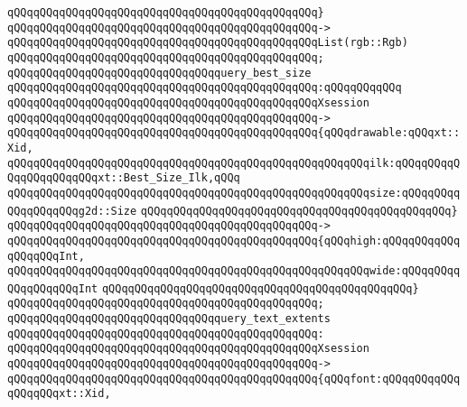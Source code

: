 \verb|qQQqqQQqqQQqqQQqqQQqqQQqqQQqqQQqqQQqqQQqqQQqqQQq}|\newline
\verb|qQQqqQQqqQQqqQQqqQQqqQQqqQQqqQQqqQQqqQQqqQQqqQQq->|\newline
\verb|qQQqqQQqqQQqqQQqqQQqqQQqqQQqqQQqqQQqqQQqqQQqqQQqList(rgb::Rgb)|\newline
\verb|qQQqqQQqqQQqqQQqqQQqqQQqqQQqqQQqqQQqqQQqqQQqqQQq;|\newline
\newline
\verb|qQQqqQQqqQQqqQQqqQQqqQQqqQQqqQQqquery_best_size|\newline
\verb|qQQqqQQqqQQqqQQqqQQqqQQqqQQqqQQqqQQqqQQqqQQqqQQq:qQQqqQQqqQQq|\newline
\verb|qQQqqQQqqQQqqQQqqQQqqQQqqQQqqQQqqQQqqQQqqQQqqQQqXsession|\newline
\verb|qQQqqQQqqQQqqQQqqQQqqQQqqQQqqQQqqQQqqQQqqQQqqQQq->|\newline
\verb|qQQqqQQqqQQqqQQqqQQqqQQqqQQqqQQqqQQqqQQqqQQqqQQq{qQQqdrawable:qQQqxt::Xid,|\newline
\verb|qQQqqQQqqQQqqQQqqQQqqQQqqQQqqQQqqQQqqQQqqQQqqQQqqQQqqQQqilk:qQQqqQQqqQQqqQQqqQQqqQQqxt::Best_Size_Ilk,qQQq|\newline
\verb|qQQqqQQqqQQqqQQqqQQqqQQqqQQqqQQqqQQqqQQqqQQqqQQqqQQqqQQqsize:qQQqqQQqqQQqqQQqqQQqg2d::Size|\newline
\verb|qQQqqQQqqQQqqQQqqQQqqQQqqQQqqQQqqQQqqQQqqQQqqQQq}|\newline
\verb|qQQqqQQqqQQqqQQqqQQqqQQqqQQqqQQqqQQqqQQqqQQqqQQq->|\newline
\verb|qQQqqQQqqQQqqQQqqQQqqQQqqQQqqQQqqQQqqQQqqQQqqQQq{qQQqhigh:qQQqqQQqqQQqqQQqqQQqInt,|\newline
\verb|qQQqqQQqqQQqqQQqqQQqqQQqqQQqqQQqqQQqqQQqqQQqqQQqqQQqqQQqwide:qQQqqQQqqQQqqQQqqQQqInt|\newline
\verb|qQQqqQQqqQQqqQQqqQQqqQQqqQQqqQQqqQQqqQQqqQQqqQQq}|\newline
\verb|qQQqqQQqqQQqqQQqqQQqqQQqqQQqqQQqqQQqqQQqqQQqqQQq;|\newline
\newline
\verb|qQQqqQQqqQQqqQQqqQQqqQQqqQQqqQQqquery_text_extents|\newline
\verb|qQQqqQQqqQQqqQQqqQQqqQQqqQQqqQQqqQQqqQQqqQQqqQQq:|\newline
\verb|qQQqqQQqqQQqqQQqqQQqqQQqqQQqqQQqqQQqqQQqqQQqqQQqXsession|\newline
\verb|qQQqqQQqqQQqqQQqqQQqqQQqqQQqqQQqqQQqqQQqqQQqqQQq->|\newline
\verb|qQQqqQQqqQQqqQQqqQQqqQQqqQQqqQQqqQQqqQQqqQQqqQQq{qQQqfont:qQQqqQQqqQQqqQQqqQQqxt::Xid,|\newline
